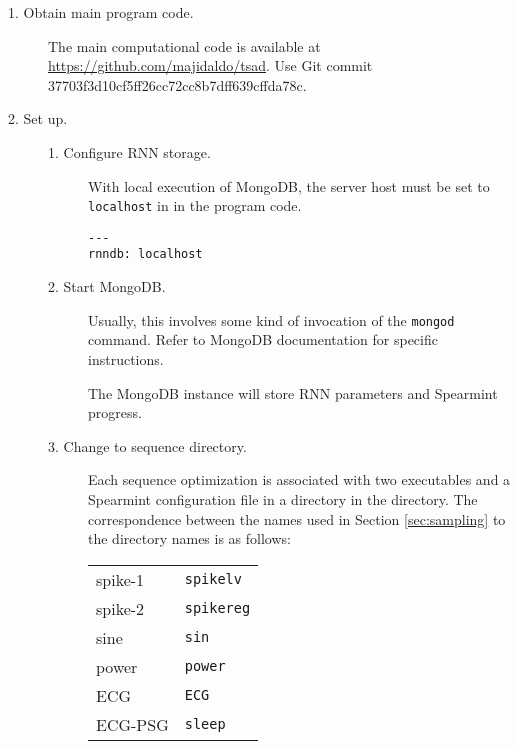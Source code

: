 \begin{description}
\item[1. Obtain main program code.] \hfill

  The main computational code is available at \url{https://github.com/majidaldo/tsad}.
  Use \textsf{Git} commit 37703f3d10cf5ff26cc72cc8b7dff639cffda78c.
  


\item[2. Set up.] \hfill

  \begin{description}

  \item[1. Configure RNN storage.] \hfill

    With local execution of \textsf{MongoDB}, the server host must be set to \texttt{localhost} in  in the program code.

\begin{verbatim}
---
rnndb: localhost
\end{verbatim}


  \item[2. Start \textsf{MongoDB}.] \hfill
    
    Usually, this involves some kind of invocation of the \texttt{mongod} command.
    Refer to \textsf{MongoDB} documentation for specific instructions.

    The \textsf{MongoDB} instance will store RNN parameters and \textsf{Spearmint} progress.


  \item[3. Change to sequence directory.] \hfill

    Each sequence optimization is associated with two executables and a \textsf{Spearmint} configuration file in a directory in the  directory.
    The correspondence between the names used in Section \ref{sec:sampling} to the directory names is as follows:
    
    \begin{tabular}{ll}
      spike-1 & \texttt{spikelv} \\
      spike-2 & \texttt{spikereg} \\
      sine    & \texttt{sin} \\
      power   & \texttt{power} \\
      ECG     & \texttt{ECG} \\
      ECG-PSG & \texttt{sleep} \\
    \end{tabular}



\end{description}
\end{description}
